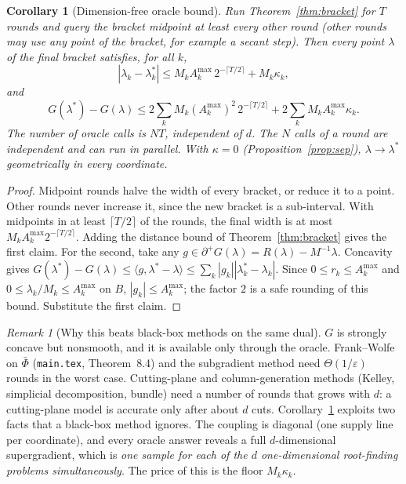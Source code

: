 \documentclass[11pt]{article}
\newtheorem{corollary}[theorem]{Corollary}
\theoremstyle{definition}
\theoremstyle{remark}
\newtheorem{remark}[theorem]{Remark}
\newcommand{\ip}[2]{\langle #1,#2\rangle}
\newcommand{\Amax}{A^{\max}}
\newcommand{\sd}{\partial^{+}}
\begin{document}
\begin{corollary}[Dimension-free oracle bound]\label{cor:rate}
Run Theorem~\ref{thm:bracket} for $T$ rounds and query the bracket midpoint at least every other round (other rounds may use any point of the bracket, for example a secant step). Then every point $\lambda$ of the final bracket satisfies, for all $k$,
\[|\lambda_k-\lambda^*_k|\le M_k\Amax_k\,2^{-\lceil T/2\rceil}+M_k\kappa_k,\]
and
\[G(\lambda^*)-G(\lambda)\le 2\sum_kM_k(\Amax_k)^2\,2^{-\lceil T/2\rceil}+2\sum_kM_k\Amax_k\kappa_k.\]
The number of oracle calls is $NT$, independent of $d$. The $N$ calls of a round are independent and can run in parallel. With $\kappa=0$ (Proposition~\ref{prop:sep}), $\lambda\to\lambda^*$ geometrically in every coordinate.
\end{corollary}
\begin{proof}
Midpoint rounds halve the width of every bracket, or reduce it to a point. Other rounds never increase it, since the new bracket is a sub-interval. With midpoints in at least $\lceil T/2\rceil$ of the rounds, the final width is at most $M_k\Amax_k2^{-\lceil T/2\rceil}$. Adding the distance bound of Theorem~\ref{thm:bracket} gives the first claim. For the second, take any $g\in\sd G(\lambda)=R(\lambda)-M^{-1}\lambda$. Concavity gives $G(\lambda^*)-G(\lambda)\le\ip{g}{\lambda^*-\lambda}\le\sum_k|g_k||\lambda^*_k-\lambda_k|$. Since $0\le r_k\le\Amax_k$ and $0\le\lambda_k/M_k\le\Amax_k$ on $B$, $|g_k|\le\Amax_k$; the factor $2$ is a safe rounding of this bound. Substitute the first claim.
\end{proof}

\begin{remark}[Why this beats black-box methods on the same dual]
$G$ is strongly concave but nonsmooth, and it is available only through the oracle. Frank--Wolfe on $\bar\Phi$ (\texttt{main.tex}, Theorem~8.4) and the subgradient method need $\Theta(1/\varepsilon)$ rounds in the worst case. Cutting-plane and column-generation methods (Kelley, simplicial decomposition, bundle) need a number of rounds that grows with $d$: a cutting-plane model is accurate only after about $d$ cuts. Corollary~\ref{cor:rate} exploits two facts that a black-box method ignores. The coupling is diagonal (one supply line per coordinate), and every oracle answer reveals a full $d$-dimensional supergradient, which is \emph{one sample for each of the $d$ one-dimensional root-finding problems simultaneously}. The price of this is the floor $M_k\kappa_k$.
\end{remark}
\end{document}

